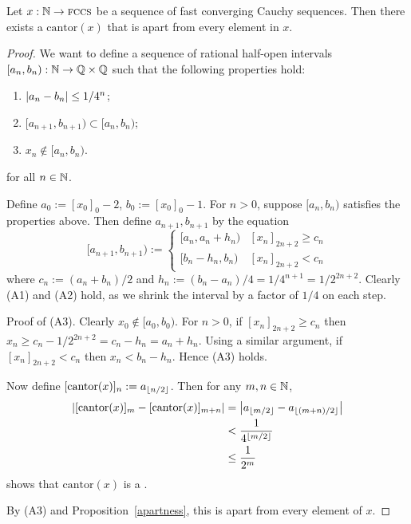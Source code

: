 \documentclass[leqno]{report}
\begin{document}
\begin{Proposition}
    Let $x : \mathbb{N} \rightarrow \textsc{fccs}$ be a sequence of fast converging Cauchy sequences. Then there exists a \FCCS{} $\mathrm{cantor}(x)$ that is apart from every element in $x$.
\end{Proposition}

\begin{proof}
    We want to define a sequence of rational half-open intervals $[a_n, b_n) : \mathbb{N} \rightarrow \mathbb{Q} \times \mathbb{Q}$ such that the following properties hold:
    \begin{enumerate}[label=(A\arabic*)]
        \item $\left| a_n - b_n \right| \leq 1/4^n$;
        \item $[a_{n+1}, b_{n+1}) \subset [a_n, b_n)$;
        \item $x_n \notin [a_n, b_n)$.
    \end{enumerate}
    for all $n \in \mathbb{N}$.

    Define $a_0 := [x_0]_0 - 2$, $b_0 := [x_0]_0 - 1$.
    For $n > 0$, suppose $[a_n, b_n)$ satisfies the properties above. Then define $a_{n+1}, b_{n+1}$ by the equation
    \[
        [a_{n+1}, b_{n+1}) := \begin{cases}
            [a_n, a_n + h_n) & [x_n]_{2n+2} \geq c_n \\
            [b_n - h_n, b_n) & [x_n]_{2n+2} < c_n
        \end{cases}
    \]
    where $c_n := (a_n + b_n) / 2$ and $h_n := (b_n - a_n) / 4 = 1/4^{n+1} = 1/2^{2n+2}$. Clearly (A1) and (A2) hold, as we shrink the interval by a factor of $1/4$ on each step.

    Proof of (A3). Clearly $x_0 \notin [a_0, b_0)$. For $n > 0$, if $[x_n]_{2n+2} \geq c_n$ then $x_n \geq c_n - 1/2^{2n+2} = c_n - h_n = a_n + h_n$. Using a similar argument, if $[x_n]_{2n+2} < c_n$ then $x_n < b_n - h_n$. Hence (A3) holds.

    Now define $[\mathrm{cantor}(x)]_n := a_{\lfloor n/2\rfloor}$. Then for any $m, n \in \mathbb{N}$,
    \begin{align*}
        \left| [\mathrm{cantor}(x)]_m - [\mathrm{cantor}(x)]_{m+n} \right|
        &= \left| a_{\lfloor m/2\rfloor} - a_{\lfloor(m+n)/2\rfloor} \right| \\
        &< \frac{1}{4^{\lfloor m/2\rfloor}} \\
        &\leq \frac{1}{2^m}
    \end{align*}
    shows that $\mathrm{cantor}(x)$ is a \FCCS.

    By (A3) and Proposition~\ref{apartness}, this is apart from every element of $x$.
\end{proof}
\end{document}
